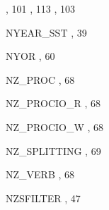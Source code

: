 \begin{theindex}
    \subitem {},  101
    \subitem {},  113
    \subitem {},  103
  \item NYEAR\_SST
    \subitem {},  39
  \item NYOR
    \subitem {},  60
  \item NZ\_PROC
    \subitem {},  68
  \item NZ\_PROCIO\_R
    \subitem {},  68
  \item NZ\_PROCIO\_W
    \subitem {},  68
  \item NZ\_SPLITTING
    \subitem {},  69
  \item NZ\_VERB
    \subitem {},  68
  \item NZSFILTER
    \subitem {},  47


\end{theindex}
